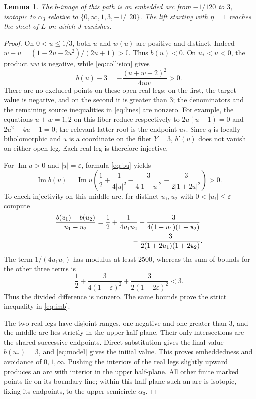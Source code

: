 \documentclass[11pt]{article}
\newtheorem{lemma}[theorem]{Lemma}
\theoremstyle{remark}
\begin{document}
\begin{lemma}\label{lem:arc}
The $b$-image of this path is an embedded arc from $-1/120$ to $3$, isotopic to $\alpha_3$ relative to $\{0,\infty,1,3,-1/120\}$. The lift starting with $\eta=1$ reaches the sheet of $L$ on which $J$ vanishes.
\end{lemma}


\begin{proof}
On $0<u\leq1/3$, both $u$ and $w(u)$ are positive and distinct. Indeed $w-u=(1-2u-2u^2)/(2u+1)>0$. Thus $b(u)<0$. On $u_*<u<0$, the product $uw$ is negative, while \eqref{eq:collision} gives
\[
 b(u)-3=-\frac{(u+w-2)^2}{4uw}>0.
\]
There are no excluded points on these open real legs: on the first, the target value is negative, and on the second it is greater than $3$; the denominators and the remaining source inequalities in \eqref{eq:lines} are nonzero. For example, the equations $u+w=1,2$ on this fiber reduce respectively to $2u(u-1)=0$ and $2u^2-4u-1=0$; the relevant latter root is the endpoint $u_*$. Since $q$ is locally biholomorphic and $u$ is a coordinate on the fiber $Y=3$, $b'(u)$ does not vanish on either open leg. Each real leg is therefore injective.

For $\operatorname{Im}u>0$ and $|u|=\varepsilon$, formula \eqref{eq:bu} yields
\begin{equation}\label{eq:imb}
 \operatorname{Im}b(u)=\operatorname{Im}u\left(
 \frac12+\frac1{4|u|^2}-\frac3{4|1-u|^2}
                  -\frac3{2|1+2u|^2}\right)>0.
\end{equation}
To check injectivity on this middle arc, for distinct $u_1,u_2$ with $0<|u_i|\leq\varepsilon$ compute
\begin{align}\label{eq:divdiff}
 \frac{b(u_1)-b(u_2)}{u_1-u_2}
 &=\frac12+\frac1{4u_1u_2}
   -\frac3{4(1-u_1)(1-u_2)}\nonumber\\
 &\hspace{18mm}-\frac3{2(1+2u_1)(1+2u_2)}.
\end{align}
The term $1/(4u_1u_2)$ has modulus at least $2500$, whereas the sum of bounds for the other three terms is
\[
 \frac12+\frac3{4(1-\varepsilon)^2}
          +\frac3{2(1-2\varepsilon)^2}<3.
\]
Thus the divided difference is nonzero. The same bounds prove the strict inequality in \eqref{eq:imb}.

The two real legs have disjoint ranges, one negative and one greater than $3$, and the middle arc lies strictly in the upper half-plane. Their only intersections are the shared successive endpoints. Direct substitution gives the final value $b(u_*)=3$, and \eqref{eq:model} gives the initial value. This proves embeddedness and avoidance of $0,1,\infty$. Pushing the interiors of the real legs slightly upward produces an arc with interior in the upper half-plane. All other finite marked points lie on its boundary line; within this half-plane such an arc is isotopic, fixing its endpoints, to the upper semicircle $\alpha_3$.


\end{proof}
\end{document}
